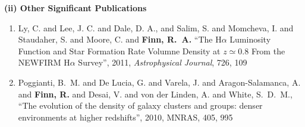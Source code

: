 \documentclass[11pt]{article}
\begin{document}
\begin{flushleft}
\medskip
{\bf (ii) Other Significant Publications} \\
\medskip
\vspace{-.3cm}
\begin{enumerate}{\setlength{\leftmargin}{0in}}
 \vspace{-.2cm}
 \item Ly, C. and Lee, J. C. and Dale, D. A., and Salim, S. and Momcheva, I. and Staudaher, S. and Moore, C. and {\bf {Finn}, R.~A.} 
 ``The H$\alpha$ Luminosity Function and Star Formation Rate Volumne
 Density at $z \simeq 0.8$ From the NEWFIRM H$\alpha$ Survey'', 2011, 
 {\it Astrophysical Journal}, 726, 109
 \vspace{-.2cm}
\item {Poggianti}, B.~M. and {De Lucia}, G. and {Varela}, J. and {Aragon-Salamanca}, A. and 
	{\bf {Finn}, R.} and {Desai}, V. and {von der Linden}, A. and {White}, S.~D.~M.,
{``The evolution of the density of galaxy clusters and groups: denser environments at higher redshifts''},
2010, MNRAS, 405, 995
\vspace{-.2cm}

\end{enumerate}
\end{flushleft}
\end{document}
